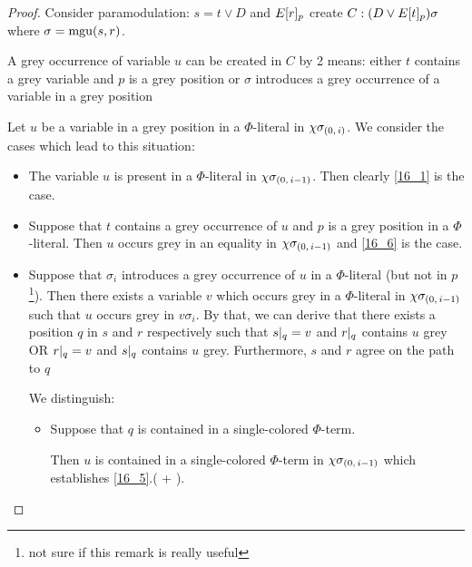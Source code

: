 \documentclass[,%
	draft=false,%
	numbers=noendperiod
	12pt,
	a4paper,
	oneside,%
	openany,
]{memoir}
\newcommand{\inv}{\ensuremath{\chi}}
\begin{document}
\begin{proof}
	Consider paramodulation: $s=t \lor D$ and $E{[r]_{p}}$ create $C: (D\lor E{[t]_{p}})\sigma$ where $\sigma = \operatorname{mgu}(s, r)$.

	A grey occurrence of variable $u$ can be created in $C$ by 2 means:
	either $t$ contains a grey variable and $p$ is a grey position or $\sigma$ introduces a grey occurrence of a variable in a grey position


	Let $u$ be a variable in a grey position in a $\Phi$-literal in $\chi\sigma_{(0,\,i)}$.
	We consider the cases which lead to this situation:


	\begin{itemize}

		\item The variable $u$ is present in a $\Phi$-literal in $\chi\sigma_{(0,\,i-1)}$. Then clearly \ref{16_1} is the case.

		\item Suppose that $t$ contains a grey occurrence of $u$ and $p$ is a grey position in a $\Phi$-literal.
			Then $u$ occurs grey in an equality in $\inv\sigmazmi$ and \ref{16_6} is the case.

		\item Suppose that $\sigma_i$ introduces a grey occurrence of $u$ in a $\Phi$-literal (but not in $p$\footnote{not sure if this remark is really useful}).
			Then there exists a variable $v$ which occurs grey in a $\Phi$-literal in $\chi\sigma_{(0,\,i-1)}$ such that $u$ occurs grey in $v\sigma_i$.
			By that, we can derive that there exists a position $q$ in $s$ and $r$ respectively such that 
			 $s|_{q} = v$ and $r|_{q}$ contains $u$ grey OR 
			$r|_{q} = v$ and $s|_{q}$ contains $u$ grey. Furthermore, $s$ and $r$ agree on the path to $q$

			We distinguish:


			\begin{itemize}
				\item Suppose that $q$ is contained in a single-colored $\Phi$-term.

					Then $u$ is contained in a single-colored $\Phi$-term in $\chi\sigma_{(0,\,i-1)}$ which establishes \ref{16_5}.( + ).


\end{itemize}
\end{itemize}
\end{proof}
\end{document}
